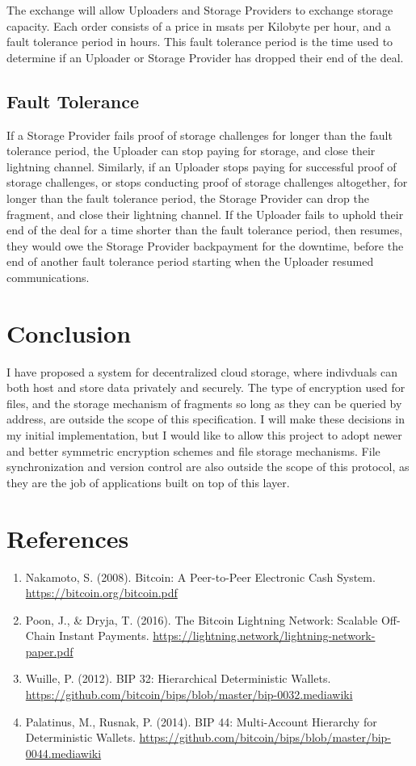\documentclass[12pt]{article}
\begin{document}
The exchange will allow Uploaders and Storage Providers to exchange storage capacity. Each order consists of a price in msats per Kilobyte per hour, and a fault tolerance period in hours. This fault tolerance period is the time used to determine if an Uploader or Storage Provider has dropped their end of the deal.

\subsection{Fault Tolerance}
If a Storage Provider fails proof of storage challenges for longer than the fault tolerance period, the Uploader can stop paying for storage, and close their lightning channel. Similarly, if an Uploader stops paying for successful proof of storage challenges, or stops conducting proof of storage challenges altogether, for longer than the fault tolerance period, the Storage Provider can drop the fragment, and close their lightning channel. If the Uploader fails to uphold their end of the deal for a time shorter than the fault tolerance period, then resumes, they would owe the Storage Provider backpayment for the downtime, before the end of another fault tolerance period starting when the Uploader resumed communications.

\section{Conclusion}
I have proposed a system for decentralized cloud storage, where indivduals can both host and store data privately and securely. The type of encryption used for files, and the storage mechanism of fragments so long as they can be queried by address, are outside the scope of this specification. I will make these decisions in my initial implementation, but I would like to allow this project to adopt newer and better symmetric encryption schemes and file storage mechanisms. File synchronization and version control are also outside the scope of this protocol, as they are the job of applications built on top of this layer.

\section{References}

\begin{enumerate}
\item Nakamoto, S. (2008). Bitcoin: A Peer-to-Peer Electronic Cash System. \url{https://bitcoin.org/bitcoin.pdf}
\item Poon, J., \& Dryja, T. (2016). The Bitcoin Lightning Network: Scalable Off-Chain Instant Payments. \url{https://lightning.network/lightning-network-paper.pdf}
\item Wuille, P. (2012). BIP 32: Hierarchical Deterministic Wallets. \url{https://github.com/bitcoin/bips/blob/master/bip-0032.mediawiki}
\item Palatinus, M., Rusnak, P. (2014). BIP 44: Multi-Account Hierarchy for Deterministic Wallets. \url{https://github.com/bitcoin/bips/blob/master/bip-0044.mediawiki}
\end{enumerate}
\end{document}
